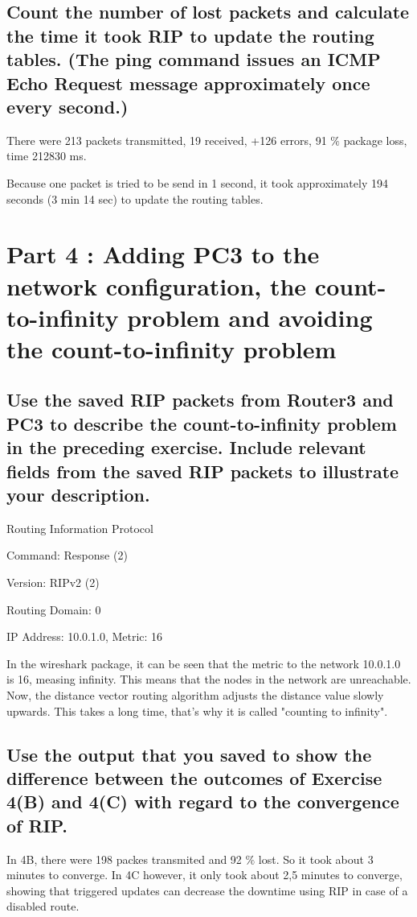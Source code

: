 \documentclass[a4paper, 11pt]{article}
\begin{document}
\subsection{Count the number of lost packets and calculate the time it took RIP to update the routing tables. (The ping command issues an ICMP Echo Request message approximately once every second.)  }

There were 213 packets transmitted, 19 received, +126 errors, 91 $\%$ package loss, time 212830 ms.

Because one packet is tried to be send in 1 second, it took approximately 194 seconds (3 min 14 sec) to update the routing tables.

\section{Part 4 : Adding PC3 to the network configuration, the count-to-infinity problem and avoiding the count-to-infinity problem}

\subsection{Use the saved RIP packets from Router3 and PC3 to describe the count-to-infinity problem in the preceding exercise. Include relevant fields from the saved RIP packets to illustrate your description. }

Routing Information Protocol

    Command: Response (2)

    Version: RIPv2 (2)

    Routing Domain: 0

    IP Address: 10.0.1.0, Metric: 16



In the wireshark package, it can be seen that the metric to the network 10.0.1.0 is 16, measing infinity. This means that the nodes in the network are unreachable. Now, the distance vector routing algorithm adjusts the distance value slowly upwards. This takes a long time, that's why it is called "counting to infinity".

\subsection{Use the output that you saved to show the difference between the outcomes of Exercise 4(B) and 4(C) with regard to the convergence of RIP. }

In 4B, there were 198 packes transmited and 92 $\%$ lost. So it took about 3 minutes to converge. In 4C however, it only took about 2,5 minutes to converge, showing that triggered updates can decrease the downtime using RIP in case of a disabled route.
\end{document}
